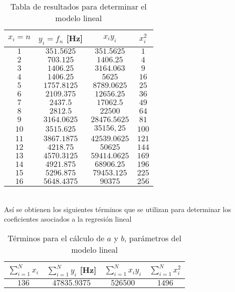 \documentclass[letterpaper,11pt]{article} %
\begin{document}
\begin{table}[H]
    \centering
    \begin{tabular}{|c|c|c|c|} \hline
         $x_i = n$ & $y_i = f_n$ [Hz] & $x_i y_i$ & $x_i^2$  \\ \hline
         $1$ & $351.5625$ & $351.5625$ & $1$\\ \hline
         $2$ & $703.125$ & $1406.25$ & $4$ \\ \hline
         $3$ & $1406.25$ & $3164.063$ & $9$ \\ \hline
         $4$ & $1406.25$ & $5625$ & $16$ \\ \hline
         $5$ & $1757.8125$ & $8789.0625$  & $25$  \\ \hline
         $6$ & $2109.375$ & $12656.25$ & $36$ \\ \hline
         $7$ & $2437.5$ & $17062.5$ & $49$ \\ \hline
         $8$ & $2812.5$ & $22500$ & $64$ \\ \hline
         $9$ & $3164.0625$ & $28476.5625$ & $81$ \\ \hline
         $10$ & $3515.625$ & $35156,25$ & $100$ \\ \hline
         $11$ & $3867.1875$ & $42539.0625$ & $121$ \\ \hline
         $12$ & $4218.75$ & $50625$ & $144$ \\ \hline
         $13$ & $4570.3125$ & $59414.0625$ & $169$ \\ \hline
         $14$ & $4921.875$ & $68906.25$ & $196$ \\ \hline
         $15$ & $5296.875$ & $79453.125$ & $225$ \\ \hline
         $16$ & $5648.4375$ & $90375$ & $256$ \\ \hline
    \end{tabular}
    \caption{Tabla de resultados para determinar el modelo lineal}
    \label{tab:(f)-1}
\end{table}

\\
Así se obtienen los siguientes términos que se utilizan para determinar los coeficientes asociados a la regresión lineal \\
\begin{table}[H]
    \centering
    \begin{tabular}{|c|c|c|c|} \hline
        $\sum_{i=1}^N x_i$ & $\sum_{i=1}^N y_i$ [Hz] & $\sum_{i=1}^N x_i y_i$ & $\sum_{i=1}^N x_i^2$ \\ \hline
        $136$ & $47835.9375$ & $526500$ & $1496$ \\ \hline
    \end{tabular}
    \caption{Términos para el cálculo de $a$ y $b$, parámetros del modelo lineal}
    \label{tab:(f)-2}
\end{table}
\end{document}
